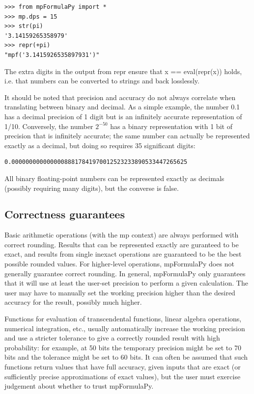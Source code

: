 \begin{lstlisting}
>>> from mpFormulaPy import *
>>> mp.dps = 15
>>> str(pi)
'3.14159265358979'
>>> repr(+pi)
"mpf('3.1415926535897931')"
\end{lstlisting}


The extra digits in the output from repr ensure that x == eval(repr(x)) holds, i.e. that numbers can be converted to strings and back losslessly.

\vpara
It should be noted that precision and accuracy do not always correlate when translating between binary and decimal. As a simple example, the number 0.1 has a decimal precision of 1 digit but is an infinitely accurate representation of 1/10. Conversely, the number $2^{-50}$ has a binary representation with 1 bit of precision that is infinitely accurate; the same number can actually be represented exactly as a decimal, but doing so requires 35 significant digits:

\begin{lstlisting}
0.00000000000000088817841970012523233890533447265625
\end{lstlisting}


All binary floating-point numbers can be represented exactly as decimals (possibly requiring many digits), but the converse is false.




\subsection{Correctness guarantees}

Basic arithmetic operations (with the mp context) are always performed with correct rounding. Results that can be represented exactly are guranteed to be exact, and results from single inexact operations are guaranteed to be the best possible rounded values. For higher-level
operations, mpFormulaPy does not generally guarantee correct rounding. In general, mpFormulaPy only guarantees that it will use at least the user-set precision to perform a given calculation. The user may have to manually set the working precision higher than the desired accuracy for the result, possibly much higher.

\vpara
Functions for evaluation of transcendental functions, linear algebra operations, numerical integration, etc., usually automatically increase the working precision and use a stricter tolerance to give a correctly rounded result with high probability: for example, at 50 bits the
temporary precision might be set to 70 bits and the tolerance might be set to 60 bits. It can often be assumed that such functions return values that have full accuracy, given inputs that are exact (or sufficiently precise approximations of exact values), but the user must exercise judgement about whether to trust mpFormulaPy.

